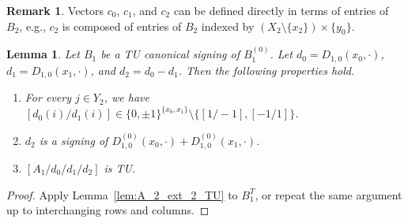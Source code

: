 \documentclass{article}
\newtheorem{lemma}{Lemma}
\theoremstyle{definition}
\newtheorem{remark}{Remark}
\begin{document}
\begin{remark}
    Vectors $c_{0}$, $c_{1}$, and $c_{2}$ can be defined directly in terms of entries of $B_{2}$, e.g., $c_{2}$ is composed of entries of $B_{2}$ indexed by $(X_{2} \setminus \{x_{2}\}) \times \{y_{0}\}$.
\end{remark}

\begin{lemma}\label{lem:A_1_ext_2_TU}
    Let $B_{1}$ be a TU canonical signing of $B_{1}^{(0)}$. Let $d_{0} = D_{1, 0} (x_{0}, \cdot)$, $d_{1} = D_{1, 0} (x_{1}, \cdot)$, and $d_{2} = d_{0} - d_{1}$. Then the following properties hold.
    \begin{enumerate}
        \item \label{item:A_2_ext_c01_eq} For every $j \in Y_{2}$, we have $[d_{0} (i) / d_{1} (i)] \in \{0, \pm 1\}^{\{x_{0}, x_{1}\}} \setminus \{[1 / -1] , [-1 / 1]\}$.
        \item\label{item:A_1_ext_2_vec_sign} $d_{2}$ is a signing of $D_{1, 0}^{(0)} (x_{0}, \cdot) + D_{1, 0}^{(0)} (x_{1}, \cdot)$.
        \item\label{item:A_1_ext_2_TU} $[A_{1} / d_{0} / d_{1} / d_{2}]$ is TU.
    \end{enumerate}
\end{lemma}

\begin{proof}
    Apply Lemma~\ref{lem:A_2_ext_2_TU} to $B_{1}^{T}$, or repeat the same argument up to interchanging rows and columns.
\end{proof}
\end{document}
